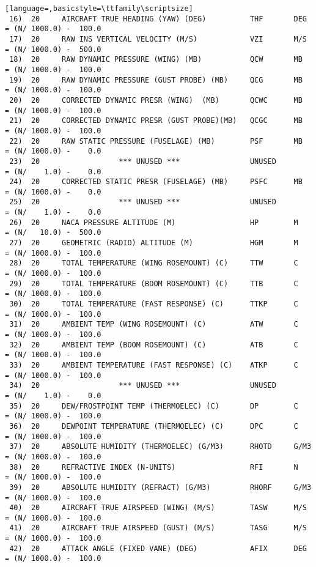 \documentclass{report}
\begin{document}
\begin{lstlisting}[language=,basicstyle=\ttfamily\scriptsize]
 16)  20     AIRCRAFT TRUE HEADING (YAW) (DEG)          THF       DEG     = (N/ 1000.0) -  100.0
 17)  20     RAW INS VERTICAL VELOCITY (M/S)            VZI       M/S     = (N/ 1000.0) -  500.0
 18)  20     RAW DYNAMIC PRESSURE (WING) (MB)           QCW       MB      = (N/ 1000.0) -  100.0
 19)  20     RAW DYNAMIC PRESSURE (GUST PROBE) (MB)     QCG       MB      = (N/ 1000.0) -  100.0
 20)  20     CORRECTED DYNAMIC PRESR (WING)  (MB)       QCWC      MB      = (N/ 1000.0) -  100.0
 21)  20     CORRECTED DYNAMIC PRESR (GUST PROBE)(MB)   QCGC      MB      = (N/ 1000.0) -  100.0
 22)  20     RAW STATIC PRESSURE (FUSELAGE) (MB)        PSF       MB      = (N/ 1000.0) -    0.0
 23)  20                  *** UNUSED ***                UNUSED            = (N/    1.0) -    0.0
 24)  20     CORRECTED STATIC PRESR (FUSELAGE) (MB)     PSFC      MB      = (N/ 1000.0) -    0.0
 25)  20                  *** UNUSED ***                UNUSED            = (N/    1.0) -    0.0
 26)  20     NACA PRESSURE ALTITUDE (M)                 HP        M       = (N/   10.0) -  500.0
 27)  20     GEOMETRIC (RADIO) ALTITUDE (M)             HGM       M       = (N/ 1000.0) -  100.0
 28)  20     TOTAL TEMPERATURE (WING ROSEMOUNT) (C)     TTW       C       = (N/ 1000.0) -  100.0
 29)  20     TOTAL TEMPERATURE (BOOM ROSEMOUNT) (C)     TTB       C       = (N/ 1000.0) -  100.0
 30)  20     TOTAL TEMPERATURE (FAST RESPONSE) (C)      TTKP      C       = (N/ 1000.0) -  100.0
 31)  20     AMBIENT TEMP (WING ROSEMOUNT) (C)          ATW       C       = (N/ 1000.0) -  100.0
 32)  20     AMBIENT TEMP (BOOM ROSEMOUNT) (C)          ATB       C       = (N/ 1000.0) -  100.0
 33)  20     AMBIENT TEMPERATURE (FAST RESPONSE) (C)    ATKP      C       = (N/ 1000.0) -  100.0
 34)  20                  *** UNUSED ***                UNUSED            = (N/    1.0) -    0.0
 35)  20     DEW/FROSTPOINT TEMP (THERMOELEC) (C)       DP        C       = (N/ 1000.0) -  100.0
 36)  20     DEWPOINT TEMPERATURE (THERMOELEC) (C)      DPC       C       = (N/ 1000.0) -  100.0
 37)  20     ABSOLUTE HUMIDITY (THERMOELEC) (G/M3)      RHOTD     G/M3    = (N/ 1000.0) -  100.0
 38)  20     REFRACTIVE INDEX (N-UNITS)                 RFI       N       = (N/ 1000.0) -  100.0
 39)  20     ABSOLUTE HUMIDITY (REFRACT) (G/M3)         RHORF     G/M3    = (N/ 1000.0) -  100.0
 40)  20     AIRCRAFT TRUE AIRSPEED (WING) (M/S)        TASW      M/S     = (N/ 1000.0) -  100.0
 41)  20     AIRCRAFT TRUE AIRSPEED (GUST) (M/S)        TASG      M/S     = (N/ 1000.0) -  100.0
 42)  20     ATTACK ANGLE (FIXED VANE) (DEG)            AFIX      DEG     = (N/ 1000.0) -  100.0

\end{lstlisting}
\end{document}
